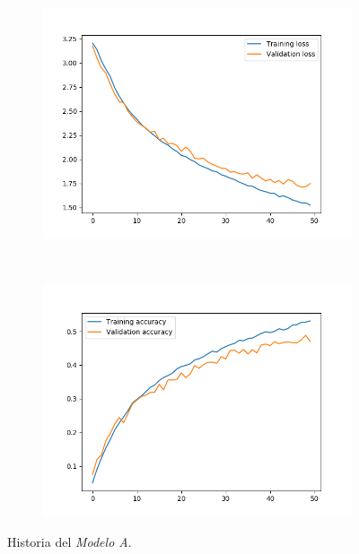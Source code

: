 \documentclass[11pt,a4paper]{article}
\begin{document}
\begin{figure}[H]
  \centering
  \begin{subfigure}{.5\textwidth}
    \includegraphics[scale=0.4]{img/deep1-drop-loss-50.png}
    \label{fig:deep1-drop-loss-50}
  \end{subfigure}%
  ~ \quad
  \begin{subfigure}{.5\textwidth}
    \includegraphics[scale=0.4]{img/deep1-drop-acc-50.png}
    \label{fig:deep1-drop-acc-50}
  \end{subfigure}
  \caption{Historia del \textit{Modelo A}.}
  \label{fig:history-deep1-drop-50}
\end{figure}
\end{document}
